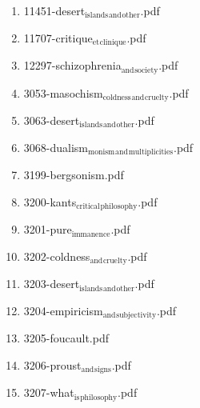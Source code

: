 \documentclass[11pt]{article}
\begin{document}
\begin{enumerate}
\begin{enumerate}
\begin{enumerate}
\item 11451-desert$_{\text{islands}}$$_{\text{and}}$$_{\text{other}}$.pdf
\label{sec-1-1-1-1-11-29-19-23-2}

\item 11707-critique$_{\text{et}}$$_{\text{clinique}}$.pdf
\label{sec-1-1-1-1-11-29-19-23-3}

\item 12297-schizophrenia$_{\text{and}}$$_{\text{society}}$.pdf
\label{sec-1-1-1-1-11-29-19-23-4}

\item 3053-masochism$_{\text{coldness}}$$_{\text{and}}$$_{\text{cruelty}}$.pdf
\label{sec-1-1-1-1-11-29-19-23-5}

\item 3063-desert$_{\text{islands}}$$_{\text{and}}$$_{\text{other}}$.pdf
\label{sec-1-1-1-1-11-29-19-23-6}

\item 3068-dualism$_{\text{monism}}$$_{\text{and}}$$_{\text{multiplicities}}$.pdf
\label{sec-1-1-1-1-11-29-19-23-7}

\item 3199-bergsonism.pdf
\label{sec-1-1-1-1-11-29-19-23-8}

\item 3200-kants$_{\text{critical}}$$_{\text{philosophy}}$.pdf
\label{sec-1-1-1-1-11-29-19-23-9}

\item 3201-pure$_{\text{immanence}}$.pdf
\label{sec-1-1-1-1-11-29-19-23-10}

\item 3202-coldness$_{\text{and}}$$_{\text{cruelty}}$.pdf
\label{sec-1-1-1-1-11-29-19-23-11}

\item 3203-desert$_{\text{islands}}$$_{\text{and}}$$_{\text{other}}$.pdf
\label{sec-1-1-1-1-11-29-19-23-12}

\item 3204-empiricism$_{\text{and}}$$_{\text{subjectivity}}$.pdf
\label{sec-1-1-1-1-11-29-19-23-13}

\item 3205-foucault.pdf
\label{sec-1-1-1-1-11-29-19-23-14}

\item 3206-proust$_{\text{and}}$$_{\text{signs}}$.pdf
\label{sec-1-1-1-1-11-29-19-23-15}

\item 3207-what$_{\text{is}}$$_{\text{philosophy}}$.pdf
\label{sec-1-1-1-1-11-29-19-23-16}


\end{enumerate}
\end{enumerate}
\end{enumerate}
\end{document}
